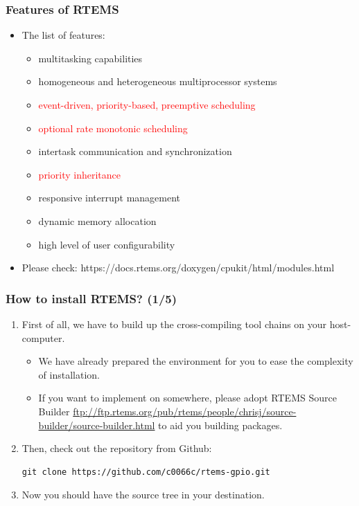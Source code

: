 \documentclass[t]{beamer}
\newcommand{\red}[1]{\textcolor{red}{#1}}
\begin{document}
\begin{frame}
\frametitle{Features of RTEMS}
\begin{itemize}
\item    The list of features:
\begin{itemize}

\item    multitasking capabilities
\item    homogeneous and heterogeneous multiprocessor systems
\item    \red{event-driven, priority-based, preemptive scheduling}
\item    \red{optional rate monotonic scheduling}
\item    intertask communication and synchronization
\item    \red{priority inheritance}
\item    responsive interrupt management
\item    dynamic memory allocation
\item    high level of user configurability
\end{itemize}



\item Please check: https://docs.rtems.org/doxygen/cpukit/html/modules.html
\end{itemize}
\end{frame}

\begin{frame}[fragile]
\frametitle{How to install RTEMS? (1/5)}
\begin{enumerate}

\item First of all, we have to build up the cross-compiling tool chains on your host-computer.
\begin{itemize}
\item We have already prepared the environment for you to ease the complexity of installation.
\item If you want to implement on somewhere, please adopt RTEMS Source Builder \url{ftp://ftp.rtems.org/pub/rtems/people/chrisj/source-builder/source-builder.html} to aid you building packages.
\end{itemize}
\item Then, check out the repository from Github:
\begin{verbatim}
git clone https://github.com/c0066c/rtems-gpio.git
\end{verbatim}
\item Now you should have the source tree in your destination.
\end{enumerate}
\end{frame}
\end{document}
